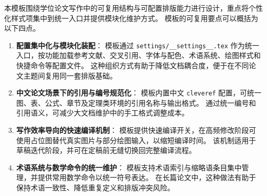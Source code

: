 本模板围绕学位论文写作中的可复用结构与可配置排版能力进行设计，重点将个性化样式项集中到统一入口并提供模块化维护方式。
模板的可复用要点可以概括为以下四点。
\begin{enumerate}

    \item \textbf{配置集中化与模块化装配}：
    模板通过 
    \texttt{settings/\_\_settings\_\_.tex}
    作为统一入口，按功能加载参考文献、交叉引用、字体与配色、术语系统、绘图样式和快捷命令等配置文件。
    这种组织方式有助于降低文档耦合度，便于在不同论文主题间复用同一套排版基础。

    \item \textbf{中文论文场景下的引用与编号规范化}：
    模板内置中文 \texttt{cleveref} 配置，可统一图、表、公式、章节及定理类环境的引用名称与输出格式。
    通过统一编号和引用语义，可减少大文档维护中的手工格式调整成本。

    \item \textbf{写作效率导向的快速编译机制}：
    模板提供快速编译开关，在高频修改阶段可使用占位图替代真实图片与部分绘图输入，以缩短编译时间。
    该机制适用于草稿迭代阶段，并可在定稿前无缝切换回完整编译流程。

    \item \textbf{术语系统与数学命令的统一维护}：
    模板支持术语索引与缩略语条目集中管理，并提供常用数学命令以统一符号表达。
    在长篇论文中，这种做法有助于保持术语一致性、降低重复定义和排版冲突风险。

\end{enumerate}
